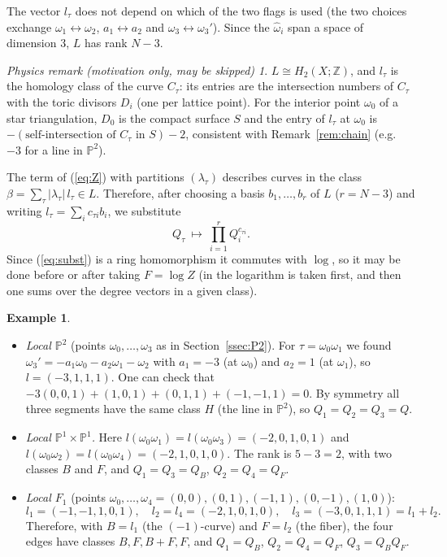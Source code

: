 \documentclass[11pt]{article}
\theoremstyle{plain}
\theoremstyle{definition}
\newtheorem{example}[theorem]{Example}
\theoremstyle{remark}
\newtheorem*{physrem}{Physics remark (motivation only, may be skipped)}
\newcommand{\Z}{\mathbb{Z}}
\newcommand{\PP}{\mathbb{P}}
\newcommand{\hatw}{\widehat{\omega}}
\begin{document}
The vector $l_\tau$ does not depend on which of the two flags is used (the two choices exchange
$\omega_1\leftrightarrow\omega_2$, $a_1\leftrightarrow a_2$ and $\omega_3\leftrightarrow\omega_3'$).
Since the $\hatw_i$ span a space of dimension 3, $L$ has rank $N-3$.

\begin{physrem}
$L\cong H_2(X;\Z)$, and $l_\tau$ is the homology class of the curve $C_\tau$: its entries are the
intersection numbers of $C_\tau$ with the toric divisors $D_i$ (one per lattice point). For the
interior point $\omega_0$ of a star triangulation, $D_0$ is the compact surface $S$ and
the entry of $l_\tau$ at $\omega_0$ is $-(\text{self-intersection of $C_\tau$ in $S$})-2$, consistent with
Remark~\ref{rem:chain} (e.g.\ $-3$ for a line in $\PP^2$).
\end{physrem}

The term of (\ref{eq:Z}) with partitions $(\lambda_\tau)$ describes curves in the class
$\beta=\sum_\tau|\lambda_\tau|\,l_\tau\in L$. Therefore, after choosing a basis $b_1,\ldots,b_r$ of $L$
($r=N-3$) and writing $l_\tau=\sum_ic_{\tau i}b_i$, we substitute
\begin{equation}\label{eq:subst}
Q_\tau\ \longmapsto\ \prod_{i=1}^rQ_i^{c_{\tau i}} .
\end{equation}
Since (\ref{eq:subst}) is a ring homomorphism it commutes with $\log$, so it may be done before
or after taking $F=\log Z$ (in \cite[(8)]{Kon} the logarithm is taken first, and then one sums
over the degree vectors in a given class).

\begin{example}\label{ex:classes}
\begin{itemize}
\item \textit{Local $\PP^2$} (points $\omega_0,\ldots,\omega_3$ as in Section~\ref{ssec:P2}). For
$\tau=\omega_0\omega_1$ we found $\omega_3'=-a_1\omega_0-a_2\omega_1-\omega_2$ with $a_1=-3$
(at $\omega_0$) and $a_2=1$ (at $\omega_1$), so $l=(-3,1,1,1)$. One can check that
$-3(0,0,1)+(1,0,1)+(0,1,1)+(-1,-1,1)=0$. By symmetry all three segments have the same class $H$
(the line in $\PP^2$), so $Q_1=Q_2=Q_3=Q$.
\item \textit{Local $\PP^1\times\PP^1$.} Here $l(\omega_0\omega_1)=l(\omega_0\omega_3)=(-2,0,1,0,1)$ and
$l(\omega_0\omega_2)=l(\omega_0\omega_4)=(-2,1,0,1,0)$. The rank is $5-3=2$, with two classes $B$
and $F$, and
$Q_1=Q_3=Q_B$, $Q_2=Q_4=Q_F$.
\item \textit{Local $F_1$} (points $\omega_0,\ldots,\omega_4=(0,0),(0,1),(-1,1),(0,-1),(1,0)$):
\begin{equation}
l_1=(-1,-1,1,0,1),\quad l_2=l_4=(-2,1,0,1,0),\quad l_3=(-3,0,1,1,1)=l_1+l_2 .
\end{equation}
Therefore, with $B=l_1$ (the $(-1)$-curve) and $F=l_2$ (the fiber), the four edges have classes
$B,F,B+F,F$, and $Q_1=Q_B$, $Q_2=Q_4=Q_F$, $Q_3=Q_BQ_F$.
\end{itemize}
\end{example}
\end{document}

